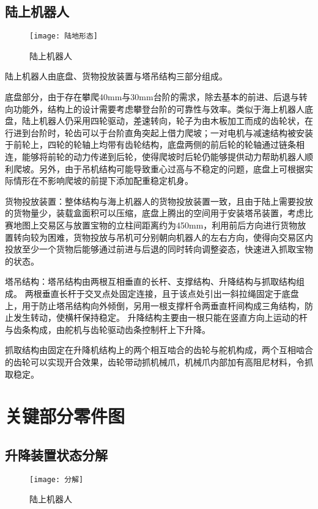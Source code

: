 \documentclass{Robot}
\begin{document}
        \subsection{陆上机器人}
        \begin{figure}[H]
            \centering
            \texttt{[image: 陆地形态]}
            \caption{陆上机器人}
        \end{figure}
        陆上机器人由底盘、货物投放装置与塔吊结构三部分组成。
        \par
        底盘部分，由于存在攀爬40mm与30mm台阶的需求，除去基本的前进、后退与转向功能外，结构上的设计需要考虑攀登台阶的可靠性与效率。类似于海上机器人底盘，陆上机器人仍采用四轮驱动，差速转向，轮子为由木板加工而成的齿轮状，在行进到台阶时，轮齿可以于台阶直角突起上借力爬坡；一对电机与减速结构被安装于前轮上，四轮的轮轴上均带有齿轮结构，底盘两侧的前后轮的轮轴通过链条相连，能够将前轮的动力传递到后轮，使得爬坡时后轮仍能够提供动力帮助机器人顺利爬坡。另外，由于吊机结构可能导致重心过高与不稳定的问题，底盘上可根据实际情形在不影响爬坡的前提下添加配重稳定机身。
        \par
        货物投放装置：整体结构与海上机器人的货物投放装置一致，且由于陆上需要投放的货物量少，装载盒面积可以压缩，底盘上腾出的空间用于安装塔吊装置，考虑比赛地图上交易区与放置宝物的立柱间距离约为450mm，利用前后方向进行货物放置转向较为困难，货物投放与吊机可分别朝向机器人的左右方向，使得向交易区内投放至少一个货物后能够通过前进与后退的同时转向调整姿态，快速进入抓取宝物的状态。
        \par
        塔吊结构：塔吊结构由两根互相垂直的长杆、支撑结构、升降结构与抓取结构组成。
        两根垂直长杆于交叉点处固定连接，且于该点处引出一斜拉绳固定于底盘上，用于防止塔吊结构向外倾倒，另用一根支撑杆令两垂直杆间构成三角结构，防止发生转动，使横杆保持稳定。
        升降结构主要由一根只能在竖直方向上运动的杆与齿条构成，由舵机与齿轮驱动齿条控制杆上下升降。
        \par
        抓取结构由固定在升降机结构上的两个相互啮合的齿轮与舵机构成，两个互相啮合的齿轮可以实现开合效果，齿轮带动抓机械爪，机械爪内部加有高阻尼材料，令抓取稳定。

    \section{关键部分零件图}

        \subsection{升降装置状态分解}
        \begin{figure}[H]
            \centering
            \texttt{[image: 分解]}
            \caption{陆上机器人}
        \end{figure}  
\end{document}
